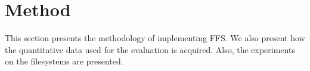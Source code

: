 
\chapter{Method}
\label{ch:methods}

This section presents the methodology of implementing FFS. We also present how the quantitative data used for the evaluation is acquired. Also, the experiments on the filesystems are presented.


